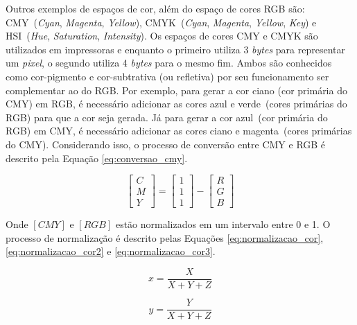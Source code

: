 \documentclass[12pt,oneside,a4paper,chapter=TITLE,section=TITLE,sumario
		=tradicional]{abntex2}
\begin{document}
		Outros exemplos de espaços de cor, além do espaço de cores RGB são: CMY~(\textit{Cyan}, \textit{Magenta}, \textit{Yellow}), CMYK~(\textit{Cyan}, \textit{Magenta}, \textit{Yellow}, \textit{Key}) e HSI~(\textit{Hue}, \textit{Saturation}, \textit{Intensity}). Os espaços de cores CMY e CMYK são utilizados em impressoras e enquanto o primeiro utiliza 3 \textit{bytes} para representar um \textit{pixel}, o segundo utiliza 4 \textit{bytes} para o mesmo fim. Ambos são conhecidos como cor-pigmento e cor-subtrativa (ou refletiva) por seu funcionamento ser complementar ao do RGB. Por exemplo, para gerar a cor ciano (cor primária do CMY) em RGB, é necessário adicionar as cores azul e verde~(cores primárias do RGB) para que a cor seja gerada. Já para gerar a cor azul~(cor primária do RGB) em CMY, é necessário adicionar as cores ciano e magenta~(cores primárias do CMY). Considerando isso, o processo de conversão entre CMY e RGB é descrito pela Equação \ref{eq:conversao_cmy}.
			
			\begin{equation}
			\label{eq:conversao_cmy}
			\begin{bmatrix} C\\M\\Y\end{bmatrix} = \begin{bmatrix} 1\\1\\1\end{bmatrix} - \begin{bmatrix} R\\G\\B\end{bmatrix}
			\end{equation}
			
		\hspace{-1.3cm}Onde $[CMY]$ e $[RGB]$ estão normalizados em um intervalo entre 0 e 1. \hspace{-0.05cm}O processo de normalização é descrito pelas Equações \ref{eq:normalizacao_cor}, \ref{eq:normalizacao_cor2} e \ref{eq:normalizacao_cor3}.
			
			\begin{equation}
			\label{eq:normalizacao_cor}
			x = \frac{X}{X+Y+Z}
			\end{equation}
			
			\begin{equation}
			\label{eq:normalizacao_cor2}
			y = \frac{Y}{X+Y+Z}
			\end{equation}
			
\end{document}
